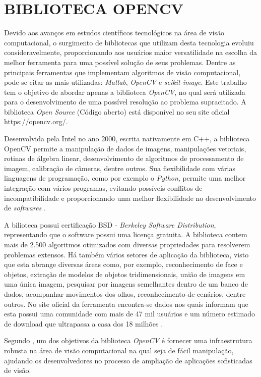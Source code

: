 \section{{BIBLIOTECA OPENCV}}

Devido aos avanços em estudos científicos tecnológicos na área de visão computacional, o surgimento de bibliotecas que utilizam desta tecnologia evoluiu consideravelmente, proporcionando aos usuários maior versatilidade na escolha da melhor ferramenta para uma possível solução de seus problemas. Dentre as principais ferramentas que implementam algoritmos de visão computacional, pode-se citar as mais utilizadas: \textit{Matlab}, \textit{OpenCV} e \textit{scikit-image}. Este trabalho tem o objetivo de abordar apenas a biblioteca \textit{OpenCV}, no qual será utilizada para o desenvolvimento de uma possível resolução ao problema supracitado. A biblioteca \textit{Open Source} (Código aberto) está disponível no seu site oficial https://opencv.org/.

Desenvolvida pela Intel no ano 2000, escrita nativamente em C++, a biblioteca OpenCV permite a manipulação de dados de imagens, manipulações vetoriais, rotinas de álgebra linear, desenvolvimento de algoritmos de processamento de imagem, calibração de câmeras, dentre outros. Sua flexibilidade com várias linguagens de programação, como por exemplo o \textit{Python}, permite uma melhor integração com vários programas, evitando possíveis conflitos de incompatibilidade e proporcionando uma melhor flexibilidade no desenvolvimento de \textit{softwares} \cite{BARBOZA2009}.

A bilioteca possui certificação BSD - \textit{Berkeley Software Distribution}, representando que o software possui uma licença gratuita. A biblioteca contem mais de 2.500 algoritmos otimizados com diversas propriedades para resolverem problemas extensos. Há também vários setores de aplicação da biblioteca, visto que esta abrange diversas áreas como, por exemplo, reconhecimento de face e objetos, extração de modelos de objetos tridimensionais, união de imagens em uma única imagem, pesquisar por imagens semelhantes dentro de um banco de dados, acompanhar movimentos dos olhos, reconhecimento de cenários, dentre outros. No site oficial da ferramenta encontra-se dados nos quais informam que esta possui uma comunidade com mais de 47 mil usuários e um número estimado de download que ultrapassa a casa dos 18 milhões \cite{CUNHA2013}.

Segundo , um dos objetivos da biblioteca \textit{OpenCV} é fornecer uma infraestrutura robusta na área de visão computacional na qual seja de fácil manipulação, ajudando os desenvolvedores no processo de ampliação de aplicações sofisticadas de visão.
